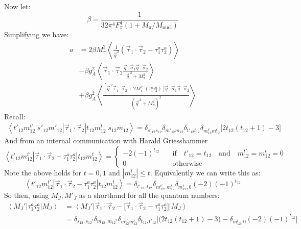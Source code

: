 \documentclass[11pt]{article}
\newcommand{\br}[1]{\left\langle #1 \right |}
\newcommand{\kt}[1]{\left| #1 \right \rangle}
\newcommand{\ot}{_{12}}
\newcommand{\tot}{t_{12}}
\newcommand{\totp}{t'_{12}}
\newcommand{\sq}{^{\,2}}
\begin{document}
Now let:
\begin{equation}
    \beta= \frac{1}{32 \pi^4 F_\pi^4 (1+M_\pi/M_{\text{nucl}})} 
\end{equation}
Simplifying we have:
\begin{align}
    a&= 2 \beta M_\pi^2\left\langle\frac{1}{\vec{q}^2}\left(\vec{\tau}_1 \cdot \vec{\tau}_2 -\tau^a_{1} \tau^a_{2}\right)\right\rangle\nonumber\\
     &-\beta g_A^2 \left\langle\vec{\tau}_{1} \cdot \vec{\tau}_{2} \frac{\vec{q} \cdot \vec{\sigma}_{1} \vec{q} \cdot \vec{\sigma}_{2}}{\vec{q}\sq+M_\pi^2}\right\rangle \\
     &+\beta g_A^2\left\langle\frac{\left[\vec{q}\sq \vec{\tau}_1 \cdot \vec{\tau}_2 +2 M_\pi^2\;\left(\tau^a_{1} \tau^a_{2}\right)\; ]\vec{q} \cdot \vec{\sigma}_{1} \vec{q}\cdot \vec{\sigma}_{2}\right.}{\left(\vec{q}\sq+M_\pi^2\right)^2}\right\rangle\nonumber
\end{align}
Recall:
\begin{align}
\br{t'_{12} m_{12}^{t'}\;s'_{12} m'_{12}}\vec{\tau}_1\cdot \vec{\tau}_2 \kt{t_{12} m_{12}^t\;s_{12} m_{12}}= \delta_{s'\ot s\ot} \delta_{m'\ot m\ot} \delta_{t'\ot t\ot}\delta_{m^{t'}\ot m^{t}\ot}\bigg[2 t_{12} (t_{12} +1) -3\bigg]
\end{align}
And from an internal communication with Harald Griesshammer 
\begin{equation}
\br{t'_{12} m_{12}^{t'}}\vec{\tau}_1\cdot \vec{\tau}_2 - \tau_1^a \tau_2^a \kt{t_{12} m_{12}^t}=
\left\{
\begin{array}{ll}
    -2 (-1)^{t\ot}&\quad\text{if}\quad t'\ot=t\ot\quad\text{and}\quad m^{t'}\ot =m^{t}\ot=0\\
    0&\quad\text{otherwise}
\end{array}
\right.
\end{equation}
Note the above holds for $t=0,1$ and $|m^t\ot|\leq t$.
Equivalently we can write this as:
\begin{equation}
\br{t'_{12} m_{12}^{t'}}\vec{\tau}_1\cdot \vec{\tau}_2 - \tau_1^a \tau_2^a \kt{t_{12} m_{12}^t}=
\delta_{t'\ot,t\ot} \delta_{m^{t'}\ot, m^t\ot} \delta_{m^t\ot,0}(-2)(-1)^{t\ot}
\end{equation}
So then, using $M_J, M'_J$ as a shorthand for all the quantum numbers:
\begin{align}
    \br{M_J'}\tau_1^a \tau_2^a \kt{M_J}&= \br{M_J'}\vec{\tau}_1 \cdot \vec{\tau}_2-\big[\vec{\tau}_1 \cdot \vec{\tau}_2 - \tau_1^a \tau_2^a \big] \kt{M_J}\\
                                       &=\delta_{s\ot,s\ot'}\delta_{m\ot,m\ot'}\delta_{m_{12}^{t'}{m_{12}^{t}}} \delta_{\tot,\totp} \Bigg[ \big( 2 t_{12} \left( \tot+1 \right) -3\big) - \delta_{m_{12}^t ,0} \left( -2 \right) (-1)^{t_{12}}\Bigg]
\end{align}
\end{document}
